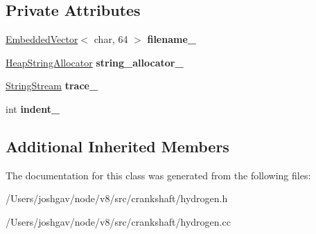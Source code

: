 \subsection*{Private Attributes}
\begin{DoxyCompactItemize}
\item 
\hyperlink{classv8_1_1internal_1_1_embedded_vector}{Embedded\+Vector}$<$ char, 64 $>$ {\bfseries filename\+\_\+}\hypertarget{classv8_1_1internal_1_1_h_tracer_a8005272a0ef05a4d63fbc6e7a40f7f16}{}\label{classv8_1_1internal_1_1_h_tracer_a8005272a0ef05a4d63fbc6e7a40f7f16}

\item 
\hyperlink{classv8_1_1internal_1_1_heap_string_allocator}{Heap\+String\+Allocator} {\bfseries string\+\_\+allocator\+\_\+}\hypertarget{classv8_1_1internal_1_1_h_tracer_a73de159b604af7ae2300ecfa08bc20f5}{}\label{classv8_1_1internal_1_1_h_tracer_a73de159b604af7ae2300ecfa08bc20f5}

\item 
\hyperlink{classv8_1_1internal_1_1_string_stream}{String\+Stream} {\bfseries trace\+\_\+}\hypertarget{classv8_1_1internal_1_1_h_tracer_a68574627f662dcacd9c8184a15d347cb}{}\label{classv8_1_1internal_1_1_h_tracer_a68574627f662dcacd9c8184a15d347cb}

\item 
int {\bfseries indent\+\_\+}\hypertarget{classv8_1_1internal_1_1_h_tracer_a0d00ded204fe038941f7a72e92e40912}{}\label{classv8_1_1internal_1_1_h_tracer_a0d00ded204fe038941f7a72e92e40912}

\end{DoxyCompactItemize}
\subsection*{Additional Inherited Members}


The documentation for this class was generated from the following files\+:\begin{DoxyCompactItemize}
\item 
/\+Users/joshgav/node/v8/src/crankshaft/hydrogen.\+h\item 
/\+Users/joshgav/node/v8/src/crankshaft/hydrogen.\+cc\end{DoxyCompactItemize}
